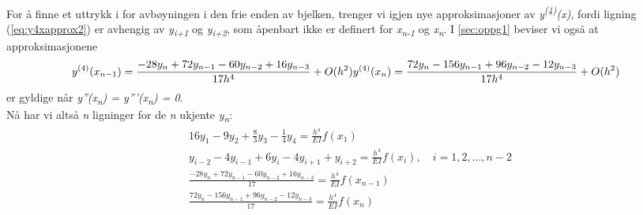 For å finne et uttrykk i for avbøyningen i den frie enden av bjelken, trenger vi igjen nye approksimasjoner av \textit{y\textsuperscript{(4)}(x)}, fordi ligning (\ref{eq:y4xapprox2}) er avhengig av \textit{y\textsubscript{i+1}} og \textit{y\textsubscript{i+2}}, som åpenbart ikke er definert for \textit{x\textsubscript{n-1}} og  \textit{x\textsubscript{n}}. I \ref{sec:oppg1} beviser vi også at approksimasjonene 
\begin{equation*}
y^{(4)}(x_{n-1}) = \frac{-28y_n + 72y_{n-1} -60y_{n-2}+16y_{n-3}}{17h^4} + O(h^2)
\\
y^{(4)}(x_{n}) = \frac{72y_n -156y_{n-1} +96y_{n-2}-12y_{n-3}}{17h^4} + O(h^2)
\end{equation*}
er gyldige når \textit{y''(x\textsubscript{n}) = y'''(x\textsubscript{n}) = 0}.\\

Nå har vi altså \textit{n} ligninger for de \textit{n} ukjente \textit{y\textsubscript{n}}:
\begin{align*}
&16y_1 - 9y_2 + \frac{8}{3}y_3 - \frac{1}{4}y_4 = \frac{h^4}{EI}f(x_1) \\
&y_{i-2} - 4y_{i-1} + 6y_i - 4y_{i+1} + y_{i+2} = \frac{h^4}{EI}f(x_i),\quad i = 1, 2,..., n-2 \\
&\frac{-28y_n + 72y_{n-1} -60y_{n-2}+16y_{n-3}}{17} = \frac{h^4}{EI}f(x_{n-1}) \\
&\frac{72y_n -156y_{n-1} +96y_{n-2}-12y_{n-3}}{17} = \frac{h^4}{EI}f(x_{n})\\
\end{align*}

